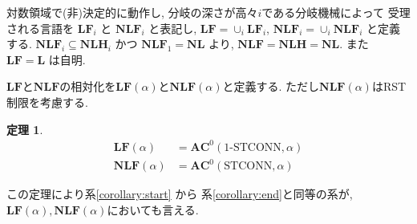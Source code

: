 \documentclass[10pt,a4paper,twocolumn]{jarticle}
\theoremstyle{definition}
\newtheorem{theorem}{定理}%
\theoremstyle{remark}
\newcommand{\classfont}{\mathbf}
\newcommand{\AC}{\classfont{AC}}
\renewcommand{\L}{\classfont{L}}
\newcommand{\NL}{\classfont{NL}}
\newcommand{\NLH}{\classfont{NLH}}
\newcommand{\cfL}{\classfont{LF}}
\newcommand{\cfNL}{\classfont{NLF}}
\newcommand{\probfont}{\text}
\newcommand{\oneSTCONN}{\probfont{1-STCONN}}
\newcommand{\STCONN}{\probfont{STCONN}}
\begin{document}
対数領域で(非)決定的に動作し, 分岐の深さが高々$i$である分岐機械によって
受理される言語を $\cfL_i$ と $\cfNL_i$ と表記し,
$\cfL = \cup_i \cfL_i$, $\cfNL_i = \cup_i \cfNL_i$ と定義する.
$\cfNL_i \subseteq \NLH_i$ かつ $\cfNL_1 = \NL$ より,
$\cfNL = \NLH = \NL$. また $\cfL = \L$ は自明.

$\cfL$と$\cfNL$の相対化を$\cfL(\alpha)$と$\cfNL(\alpha)$と定義する.
ただし$\cfNL(\alpha)$はRST制限を考慮する.
\begin{theorem}
 \begin{align*}
  \cfL(\alpha) &= \AC^0(\oneSTCONN, \alpha)
  \\
  \cfNL(\alpha) &= \AC^0(\STCONN, \alpha)
 \end{align*}  
\end{theorem}

この定理により系\ref{corollary:start} から 系\ref{corollary:end}と同等の系が,
$\cfL(\alpha), \cfNL(\alpha)$においても言える.
\end{document}
